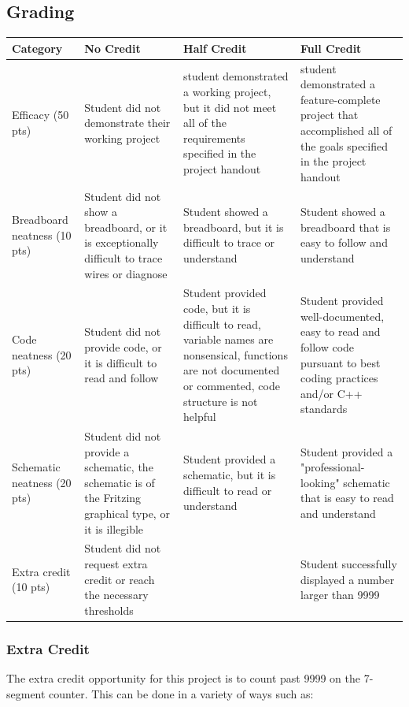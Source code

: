 \documentclass{article}
\begin{document}
    \subsection*{Grading}
    \begin{tabular}{ | p{1in} | p{1.75in} | p{1.75in} | p{1.75in} | }
        \hline
        \textbf{Category} & \textbf{No Credit} & \textbf{Half Credit} & \textbf{Full Credit} \\

        \hline
        Efficacy (50 pts) & 
        Student did not demonstrate their working project & 
        student demonstrated a working project, but it did not meet all of the requirements specified in the project handout & 
        student demonstrated a feature-complete project that accomplished all of the goals specified in the project handout \\
        \hline
        Breadboard neatness (10 pts) & 
        Student did not show a breadboard, or it is exceptionally difficult to trace wires or diagnose &
        Student showed a breadboard, but it is difficult to trace or understand &
        Student showed a breadboard that is easy to follow and understand \\
        \hline
        Code neatness (20 pts) & 
        Student did not provide code, or it is difficult to read and follow &
        Student provided code, but it is difficult to read, variable names are nonsensical, functions are not documented or commented, code structure is not helpful &
        Student provided well-documented, easy to read and follow code pursuant to best coding practices and/or C++ standards \\
        \hline
        Schematic neatness (20 pts) & 
        Student did not provide a schematic, the schematic is of the Fritzing graphical type, or it is illegible &
        Student provided a schematic, but it is difficult to read or understand &
        Student provided a "professional-looking" schematic that is easy to read and understand \\
        \hline
        Extra credit (10 pts) &
        Student did not request extra credit or reach the necessary thresholds & 
        &
        Student successfully displayed a number larger than 9999 \\

        \hline
    \end{tabular}

        \subsubsection*{Extra Credit}
        The extra credit opportunity for this project is to count past 9999 on the 7-segment counter.
        This can be done in a variety of ways such as:
        
\end{document}
